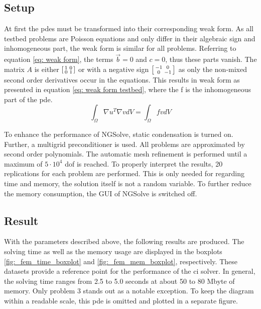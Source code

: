 \documentclass[./\jobname.tex]{subfiles}
\begin{document}
\subsection{Setup}
At first the \gls{pde}s must be transformed into their corresponding weak form. As all testbed problems are Poisson equations and only differ in their algebraic sign and inhomogeneous part, the weak form is similar for all problems. Referring to equation \eqref{eq: weak form}, the terms $\vec{b} = 0$ and $c = 0$, thus these parts vanish. The matrix $A$ is either $\begin{bsmallmatrix} 1 & 0 \\ 0 & 1 \end{bsmallmatrix}$ or with a negative sign $\begin{bsmallmatrix} -1 & 0 \\ 0 & -1 \end{bsmallmatrix}$ as only the non-mixed second order derivatives occur in the equations. This results in weak form as presented in equation \eqref{eq: weak form testbed}, where the f is the inhomogeneous part of the \gls{pde}.
\begin{equation}
\label{eq: weak form testbed}
\int_{\Omega} \nabla u^T \nabla v dV = \int_{\Omega} f v dV
\end{equation}

To enhance the performance of NGSolve, static condensation is turned on. Further, a multigrid preconditioner is used. All problems are approximated by second order polynomials. The automatic mesh refinement is performed until a maximum of $5 \cdot 10^4$ \gls{dof} is reached. To properly interpret the results, 20 replications for each problem are performed. This is only needed for regarding time and memory, the solution itself is not a random variable. To further reduce the memory consumption, the GUI of NGSolve is switched off. 

\subsection{Result}
With the parameters described above, the following results are produced. The solving time as well as the memory usage are displayed in the boxplots \ref{fig:_fem_time_boxplot} and \ref{fig:_fem_mem_boxplot}, respectively. These datasets provide a reference point for the performance of the \gls{ci} solver. In general, the solving time ranges from 2.5 to 5.0 seconds at about 50 to 80 Mbyte of memory. Only problem 3 stands out as a notable exception. To keep the diagram within a readable scale, this \gls{pde} is omitted and plotted in a separate figure. 
\end{document}
